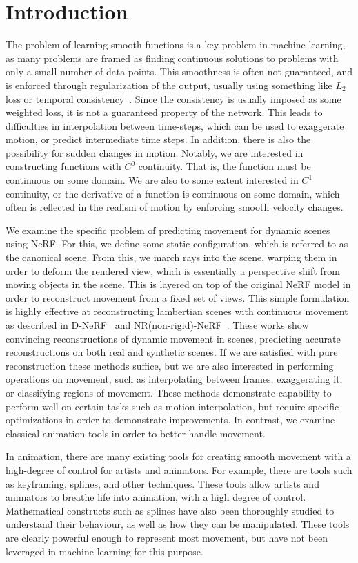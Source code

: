 \section{Introduction}

The problem of learning smooth functions is a key problem in machine learning, as many problems
are framed as finding continuous solutions to problems with only a small number of data points.
This smoothness is often not guaranteed, and is enforced through regularization of the output,
usually using something like $L_2$ loss or temporal consistency~\cite{nr-nerf}. Since
the consistency is usually imposed as some weighted loss, it is not a guaranteed property of the
network. This leads to difficulties in interpolation between time-steps, which can be used to
exaggerate motion, or predict intermediate time steps. In addition, there is also the
possibility for sudden changes in motion.
Notably, we are interested in constructing functions with $C^0$ continuity. That is, the
function must be continuous on some domain. We are also to some extent interested in $C^1$
continuity, or the derivative of a function is continuous on some domain, which often is
reflected in the realism of motion by enforcing smooth velocity changes.

We examine the specific problem of predicting movement for dynamic scenes using NeRF. For this,
we define some static configuration, which is referred to as the canonical scene. From this, we
march rays into the scene, warping them in order to deform the rendered view, which is
essentially a perspective shift from moving objects in the scene. This is layered on top of the
original NeRF model in order to reconstruct movement from a fixed set of views. This simple
formulation is highly effective at reconstructing lambertian scenes with continuous movement as
described in D-NeRF~\cite{dnerf} and NR(non-rigid)-NeRF~\cite{nr-nerf}. These works show convincing
reconstructions of dynamic movement in scenes, predicting accurate reconstructions on both real
and synthetic scenes. If we are satisfied with pure reconstruction these methods suffice, but we
are also interested in performing operations on movement, such as interpolating between frames,
exaggerating it, or classifying regions of movement. These methods demonstrate capability to
perform well on certain tasks such as motion interpolation, but require specific optimizations
in order to demonstrate improvements. In contrast, we examine classical animation tools in order
to better handle movement.

In animation, there are many existing tools for creating smooth movement with a high-degree of
control for artists and animators. For example, there are tools such as keyframing, splines,
and other techniques. These tools allow artists and animators to breathe life into animation,
with a high degree of control. Mathematical constructs such as splines have also been thoroughly
studied to understand their behaviour, as well as how they can be manipulated. These tools are
clearly powerful enough to represent most movement, but have not been leveraged in machine
learning for this purpose.

